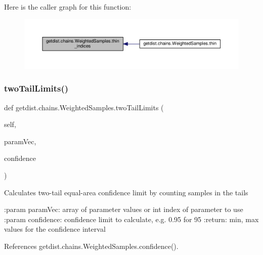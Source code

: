 Here is the caller graph for this function\+:
\nopagebreak
\begin{figure}[H]
\begin{center}
\leavevmode
\includegraphics[width=350pt]{classgetdist_1_1chains_1_1WeightedSamples_a41dc494a820fc43ecbf7a58dd32e4602_icgraph}
\end{center}
\end{figure}
\mbox{\label{classgetdist_1_1chains_1_1WeightedSamples_a85a7b24ea47b3ff8a4f1595e026abae4}} 
\subsubsection{\texorpdfstring{two\+Tail\+Limits()}{twoTailLimits()}}
{\footnotesize\ttfamily def getdist.\+chains.\+Weighted\+Samples.\+two\+Tail\+Limits (\begin{DoxyParamCaption}\item[{}]{self,  }\item[{}]{param\+Vec,  }\item[{}]{confidence }\end{DoxyParamCaption})}

\begin{DoxyVerb}Calculates two-tail equal-area confidence limit by counting samples in the tails

:param paramVec: array of parameter values or int index of parameter to use
:param confidence: confidence limit to calculate, e.g. 0.95 for 95%
:return: min, max values for the confidence interval
\end{DoxyVerb}
 

References getdist.\+chains.\+Weighted\+Samples.\+confidence().

